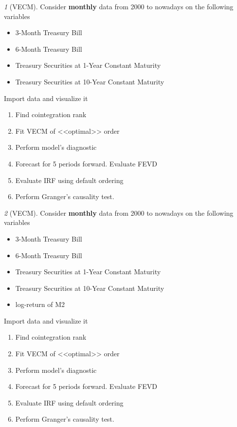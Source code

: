 \documentclass[12pt]{article}
\theoremstyle{remark}
\newtheorem{exercise}{}[section]
\begin{document}
\begin{exercise}[VECM]
Consider \textbf{monthly} data from 2000 to nowadays on the following variables
\begin{itemize}
	\item 3-Month Treasury Bill
	\item 6-Month Treasury Bill
	\item Treasury Securities at 1-Year Constant Maturity
	\item Treasury Securities at 10-Year Constant Maturity
\end{itemize}
Import data and visualize it
\begin{enumerate}
	\item Find cointegration rank
	\item Fit VECM of <<optimal>> order
	\item Perform model's diagnostic
	\item Forecast for 5 periods forward. Evaluate FEVD
	\item Evaluate IRF using default ordering
	\item Perform Granger's causality test.
\end{enumerate}
\end{exercise}

\begin{exercise}[VECM]
Consider \textbf{monthly} data from 2000 to nowadays on the following variables
\begin{itemize}
	\item 3-Month Treasury Bill
	\item 6-Month Treasury Bill
	\item Treasury Securities at 1-Year Constant Maturity
	\item Treasury Securities at 10-Year Constant Maturity
	\item log-return of M2
\end{itemize}
Import data and visualize it
\begin{enumerate}
	\item Find cointegration rank
	\item Fit VECM of <<optimal>> order
	\item Perform model's diagnostic
	\item Forecast for 5 periods forward. Evaluate FEVD
	\item Evaluate IRF using default ordering
	\item Perform Granger's causality test.
\end{enumerate}
\end{exercise}
	
\end{document}
